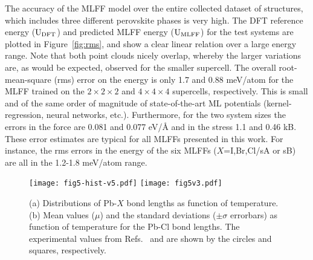 \documentclass[journal=jpccck,manuscript=article,layout=twocolumn]{achemso}
\begin{document}
The accuracy of the MLFF model over the entire collected dataset of structures, which includes three different perovskite phases is very high. The DFT reference energy ($\rm U_{DFT}$) and predicted MLFF energy ($\rm U_{MLFF}$) for the test systems are plotted in Figure~\ref{fig:rms}, and show a clear linear relation over a large energy range. Note that both point clouds nicely overlap, whereby the larger variations are, as would be expected, observed for the smaller supercell. The overall root-mean-square (rms) error on the energy is only 1.7 and 0.88 meV/atom for the MLFF trained on the $2\times2\times2$ and $4\times4\times4$ supercells, respectively. This is small and of the same order of magnitude of state-of-the-art ML potentials (kernel-regression\cite{Bartok:prx18}, neural networks\cite{Behler:cmrev21}, etc.). Furthermore, for the two system sizes the errors in the force are 0.081 and 0.077 eV/\AA{} and in the stress 1.1 and 0.46 kB. These error estimates are typical for all MLFFs presented in this work. For instance, the rms errors in the energy of the six MLFFs ($X$=I,Br,Cl/sA or sB) are all in the 1.2-1.8 meV/atom range.



\begin{figure}[!b]
    \begin{center}
    \texttt{[image: fig5-hist-v5.pdf]}
    \texttt{[image: fig5v3.pdf]}
    \end{center}
   \caption{(a) Distributions of Pb-$X$ bond lengths as function of temperature. (b) Mean values ($\mu$) and the standard deviations ($\pm\sigma$ errorbars) as function of temperature for the Pb-Cl bond lengths. The experimental values from Refs.~\cite{Chi:jssc05} and \cite{Bernasconi:jpcc18} are shown by the circles and squares, respectively.}
\label{fig:5}
\end{figure}
\end{document}
